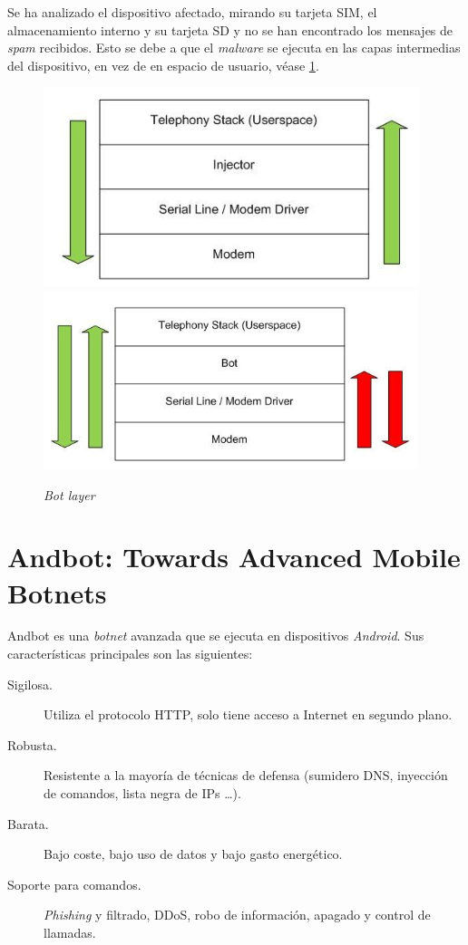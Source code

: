 \documentclass[a4paper,11pt]{report}
\begin{document}
Se ha analizado el dispositivo afectado, mirando su tarjeta SIM, el almacenamiento interno y su tarjeta SD y no se han encontrado los mensajes de \emph{spam} recibidos. Esto se debe a que el \emph{malware} se ejecuta en las capas intermedias del dispositivo, en vez de en espacio de usuario, véase \ref{botLayer}.

\begin{figure}[htb]
\begin{center}
\includegraphics[scale=0.8]{previo1}
\includegraphics[scale=0.9]{previo2}
\caption{\emph{Bot layer}}
\label{botLayer}
\end{center}
\end{figure}

\section*{Andbot: Towards Advanced Mobile Botnets}

Andbot es una \emph{botnet} avanzada que se ejecuta en dispositivos \emph{Android}. Sus características principales son las siguientes:

\begin{description}
\item[Sigilosa.] Utiliza el protocolo HTTP, solo tiene acceso a Internet en segundo plano.
\item[Robusta.] Resistente a la mayoría de técnicas de defensa (sumidero DNS, inyección de comandos, lista negra de IPs \ldots).
\item[Barata.] Bajo coste, bajo uso de datos y bajo gasto energético.
\item[Soporte para comandos.] \emph{Phishing} y filtrado, DDoS, robo de información, apagado y control de llamadas.
\end{description}
\end{document}

